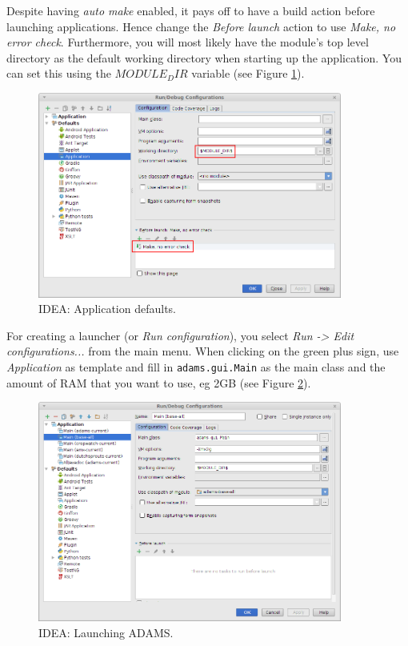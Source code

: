 Despite having \textit{auto make} enabled, it pays off to have a build
action before launching applications. Hence change the \textit{Before launch}
action to use \textit{Make, no error check}. Furthermore, you will most
likely have the module's top level directory as the default working directory
when starting up the application. You can set this using the
\texttt{$MODULE_DIR$} variable (see Figure \ref{intellij-app_defaults}).
\begin{figure}[htb]
  \centering
  \includegraphics[width=10.0cm]{images/intellij-app_defaults.png}
  \caption{IDEA: Application defaults.}
  \label{intellij-app_defaults}
\end{figure}

For creating a launcher (or \textit{Run configuration}), you select
\textit{Run -> Edit configurations...} from the main menu. When clicking on
the green plus sign, use \textit{Application} as template and fill in
\texttt{adams.gui.Main} as the main class and the amount of RAM that you want
to use, eg 2GB (see Figure \ref{intellij-main}).
\begin{figure}[htb]
  \centering
  \includegraphics[width=10.0cm]{images/intellij-main.png}
  \caption{IDEA: Launching ADAMS.}
  \label{intellij-main}
\end{figure}

